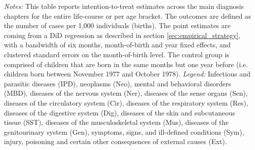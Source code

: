 \documentclass[11pt, a4paper, draft]{article} %
\begin{document}
\begin{table}[H]
\begin{threeparttable}
{\begin{tabular}{l*{5}{c}}
				\bottomrule 
		\end{tabular}}
	\end{threeparttable} 
	\begin{minipage}{0.95\linewidth}
		\scriptsize \emph{Notes:} This table reports intention-to-treat estimates across the main diagnosis chapters for the entire life-course or per age bracket. The outcomes are defined as the number of cases per 1,000 individuals (births). The point estimates are coming from a DiD regression as described in section \ref{sec:empirical_strategy}, with a bandwidth of six months, month-of-birth and year fixed effects, and clustered standard errors on the month-of-birth level. The control group is comprised of children that are born in the same months but one year before (i.e. children born between November 1977 and October 1978).\newline
		\emph{Legend:} Infectious and parasitic diseases (IPD), neoplasms (Neo), mental and behavioral disorders (MBD), diseases of the nervous system (Ner), diseases of the sense organs (Sen), diseases of the circulatory system (Cir), diseases of the respiratory system (Res), diseases of the digestive system (Dig), diseases of the skin and subcutaneous tissue (SST), diseases of the musculoskeletal system (Mus), diseases of the genitourinary system (Gen), symptoms, signs, and ill-defined conditions (Sym), injury, poisoning and certain other consequences of external causes (Ext).
	\end{minipage}
\end{table} 
\vspace*{\fill}\clearpage 
\restoregeometry



\end{document}
